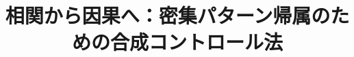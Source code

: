 \documentclass[conference]{IEEEtran}
\begin{document}
\title{相関から因果へ：密集パターン帰属のための合成コントロール法}

\author{
}

\maketitle











\end{document}
